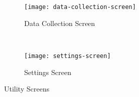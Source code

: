 \begin{figure*}[ht]
    \centering
    \begin{subfigure}[t]{0.4\textwidth}
        \centering
        \texttt{[image: data-collection-screen]}
        \caption{Data Collection Screen}
    \end{subfigure}%
    ~ 
    \begin{subfigure}[t]{0.4\textwidth}
        \centering
        \texttt{[image: settings-screen]}
        \caption{Settings Screen}
    \end{subfigure}
    \caption{Utility Screens}
\end{figure*}